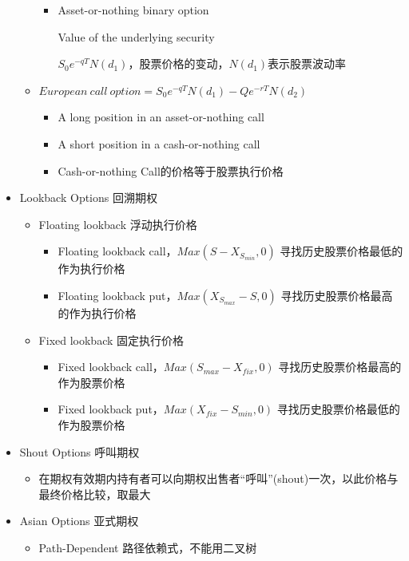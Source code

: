 \documentclass[a4paper,6pt,twoside,openany]{article}
\begin{document}
\begin{itemize}
\begin{itemize}
\begin{itemize}
      \item Asset-or-nothing binary option
        \par Value of the underlying security
        \par $S_0e^{-qT}N(d_1)$，股票价格的变动，$N(d_1)$表示股票波动率
      \end{itemize}
    \item $European\ call\ option = S_0e^{-qT}N(d_1) - Qe^{-rT}N(d_2)$
      \begin{itemize}
      \item A long position in an asset-or-nothing call
      \item A short position in a cash-or-nothing call
        \item Cash-or-nothing Call的价格等于股票执行价格
      \end{itemize} 
    \end{itemize}
  \item Lookback Options 回溯期权
    \begin{itemize}
    \item Floating lookback 浮动执行价格
      \begin{itemize}
      \item Floating lookback call，$Max(S - X_{S_{min}},0)$ 寻找历史股票价格最低的作为执行价格
      \item Floating lookback put，$Max(X_{S_{max}} - S,0)$ 寻找历史股票价格最高的作为执行价格
      \end{itemize}
    \item Fixed lookback 固定执行价格
      \begin{itemize}
      \item Fixed lookback call，$Max(S_{max} - X_{fix},0)$ 寻找历史股票价格最高的作为股票价格
       \item Fixed lookback put，$Max(X_{fix} - S_{min},0)$ 寻找历史股票价格最低的作为股票价格
      \end{itemize}
    \end{itemize}
  \item Shout Options 呼叫期权
    \begin{itemize}
    \item 在期权有效期内持有者可以向期权出售者“呼叫”(shout)一次，以此价格与最终价格比较，取最大
    \end{itemize}
  \item Asian Options 亚式期权
    \begin{itemize}
    \item Path-Dependent 路径依赖式，不能用二叉树

\end{itemize}
\end{itemize}
\end{document}
